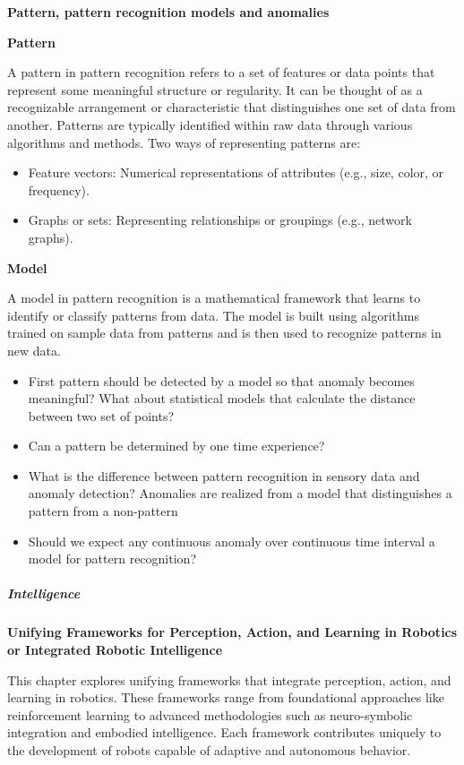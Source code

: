 \documentclass{book}
\providecommand{\ProjectDeepHeading}[2]{%
    \par\medskip\noindent\textbf{#2}\par\smallskip
}
\begin{document}
\ProjectDeepHeading{2}{Pattern, pattern recognition models and anomalies}
    \ProjectDeepHeading{3}{Pattern} A pattern in pattern recognition refers to a set of features or data points that represent some meaningful structure or regularity. It can be thought of as a recognizable arrangement or characteristic that distinguishes one set of data from another. Patterns are typically identified within raw data through various algorithms and methods. Two ways of representing patterns are:
    \begin{itemize}
        \item Feature vectors: Numerical representations of attributes (e.g., size, color, or frequency).
        \item Graphs or sets: Representing relationships or groupings (e.g., network graphs).
    \end{itemize}
    \ProjectDeepHeading{3}{Model}
    A model in pattern recognition is a mathematical framework that learns to identify or classify patterns from data. The model is built using algorithms trained on sample data from patterns and is then used to recognize patterns in new data.
    \begin{itemize}
        \item First pattern should be detected by a model so that anomaly becomes meaningful? What about statistical models that calculate the distance between two set of points?
        \item Can a pattern be determined by one time experience?
    \end{itemize}
    \begin{itemize}
        \item What is the difference between pattern recognition in sensory data and anomaly detection? Anomalies are realized from a model that distinguishes a pattern from a non-pattern
        \item Should we expect any continuous anomaly over continuous time interval a model for pattern recognition?
    \end{itemize}

\subparagraph{Intelligence}


\ProjectDeepHeading{2}{Unifying Frameworks for Perception, Action, and Learning in Robotics or Integrated Robotic Intelligence}
This chapter explores unifying frameworks that integrate perception, action, and learning in robotics. These frameworks range from foundational approaches like reinforcement learning to advanced methodologies such as neuro-symbolic integration and embodied intelligence. Each framework contributes uniquely to the development of robots capable of adaptive and autonomous behavior.
\end{document}

